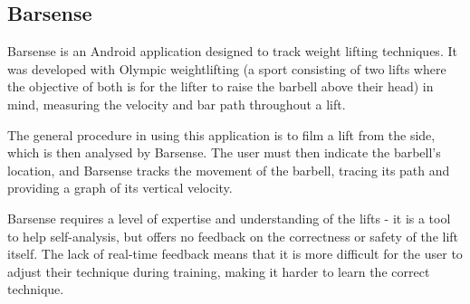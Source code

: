 \subsection{Barsense}

Barsense\cite{barsense} is an Android application designed to track weight lifting techniques. It was developed with Olympic weightlifting (a sport consisting of two lifts where the objective of both is for the lifter to raise the barbell above their head) in mind, measuring the velocity and bar path throughout a lift.

The general procedure in using this application is to film a lift from the side, which is then analysed by Barsense. The user must then indicate the barbell's location, and Barsense tracks the movement of the barbell, tracing its path and providing a graph of its vertical velocity.

Barsense requires a level of expertise and understanding of the lifts - it is a tool to help self-analysis, but offers no feedback on the correctness or safety of the lift itself. The lack of real-time feedback means that it is more difficult for the user to adjust their technique during training, making it harder to learn the correct technique.